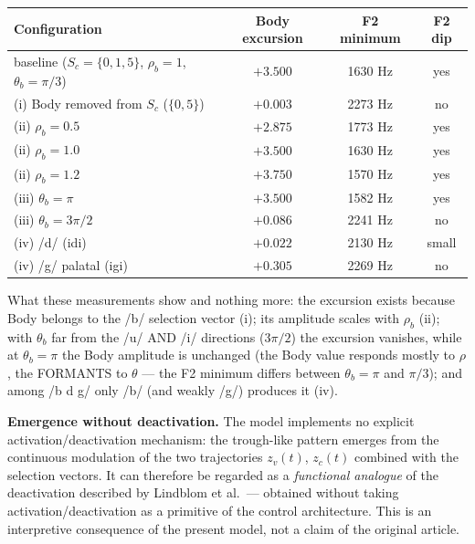 \documentclass[11pt,a4paper]{article}
\begin{document}
\begin{center}
\begin{tabular}{lccc}
\toprule
Configuration & Body excursion & F2 minimum & F2 dip \\
\midrule
baseline ($S_c = \{0,1,5\}$, $\rho_b=1$, $\theta_b=\pi/3$) & $+3.500$ & 1630 Hz & yes \\
(i) Body removed from $S_c$ ($\{0,5\}$) & $+0.003$ & 2273 Hz & no \\
(ii) $\rho_b = 0.5$ & $+2.875$ & 1773 Hz & yes \\
(ii) $\rho_b = 1.0$ & $+3.500$ & 1630 Hz & yes \\
(ii) $\rho_b = 1.2$ & $+3.750$ & 1570 Hz & yes \\
(iii) $\theta_b = \pi$ & $+3.500$ & 1582 Hz & yes \\
(iii) $\theta_b = 3\pi/2$ & $+0.086$ & 2241 Hz & no \\
(iv) /d/ (idi) & $+0.022$ & 2130 Hz & small \\
(iv) /g/ palatal (igi) & $+0.305$ & 2269 Hz & no \\
\bottomrule
\end{tabular}

\smallskip
What these measurements show and nothing more: the excursion exists
because Body belongs to the /b/ selection vector (i); its amplitude
scales with $\rho_b$ (ii); with $\theta_b$ far from the /u/ AND /i/
directions ($3\pi/2$) the excursion vanishes, while at
$\theta_b = \pi$ the Body amplitude is unchanged (the Body value
responds mostly to $\rho$, the FORMANTS to $\theta$ --- the F2
minimum differs between $\theta_b = \pi$ and $\pi/3$); and among
/b d g/ only /b/ (and weakly /g/) produces it (iv).
\end{center}

\textbf{Emergence without deactivation.} The model implements no
explicit activation/deactivation mechanism: the trough-like pattern
emerges from the continuous modulation of the two trajectories
$z_v(t)$, $z_c(t)$ combined with the selection vectors. It can
therefore be regarded as a \emph{functional analogue} of the
deactivation described by Lindblom et al.\ --- obtained without
taking activation/deactivation as a primitive of the control
architecture. This is an interpretive consequence of the present
model, not a claim of the original article.
\end{document}
